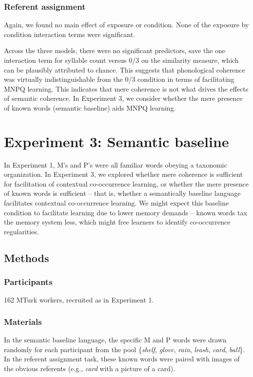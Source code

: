 \documentclass[man,floatsintext]{apa6}
\begin{document}
\subsubsection{Referent assignment}
Again, we found no main effect of exposure or condition. None of the exposure by condition interaction terms were significant.

Across the three models, there were no significant predictors, save the one interaction term for syllable count versus 0/3 on the similarity measure, which can be plausibly attributed to chance. This suggests that phonological coherence was virtually indistinguishable from the 0/3 condition in terms of facilitating MNPQ learning. This indicates that mere coherence is not what drives the effects of semantic coherence. In Experiment 3, we consider whether the mere presence of known words (semantic baseline) aids MNPQ learning.

\section{Experiment 3: Semantic baseline}

In Experiment 1, M's and P's were all familiar words obeying a taxonomic organization. In Experiment 3, we explored whether mere coherence is sufficient for facilitation of contextual co-occurrence learning, or whether the mere presence of known words is sufficient -- that is, whether a semantically baseline language facilitates contextual co-occurrence learning. We might expect this baseline condition to facilitate learning due to lower memory demands -- known words tax the memory system less, which might free learners to identify co-occurrence regularities.

\subsection{Methods}
\subsubsection{Participants}
162 MTurk workers, recruited as in Experiment 1.

\subsubsection{Materials}
In the semantic baseline language, the specific M and P words were drawn randomly for each participant from the pool \{\emph{shelf}, \emph{glove}, \emph{rain}, \emph{leash}, \emph{card}, \emph{ball}\}. In the referent assignment task, these known words were paired with images of the obvious referents (e.g., \emph{card} with a picture of a card).
\end{document}
